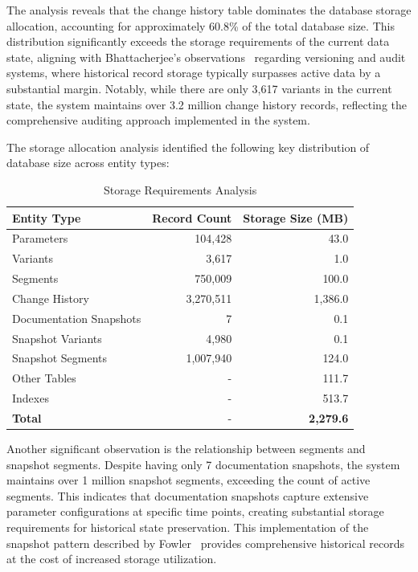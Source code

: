 The analysis reveals that the change history table dominates the database storage allocation, accounting for approximately 60.8\% of the total database size. This distribution significantly exceeds the storage requirements of the current data state, aligning with Bhattacherjee's observations~\cite{bhattacherjee2015principles} regarding versioning and audit systems, where historical record storage typically surpasses active data by a substantial margin. Notably, while there are only 3,617 variants in the current state, the system maintains over 3.2 million change history records, reflecting the comprehensive auditing approach implemented in the system.

The storage allocation analysis identified the following key distribution of database size across entity types:

\begin{table}[h]
\centering
\caption{Storage Requirements Analysis}
\label{tab:storage-requirements}
\begin{tabular}{|l|r|r|}
\hline
\textbf{Entity Type} & \textbf{Record Count} & \textbf{Storage Size (MB)} \\
\hline
Parameters & 104,428 & 43.0 \\
\hline
Variants & 3,617 & 1.0 \\
\hline
Segments & 750,009 & 100.0 \\
\hline
Change History & 3,270,511 & 1,386.0 \\
\hline
Documentation Snapshots & 7 & 0.1 \\
\hline
Snapshot Variants & 4,980 & 0.1 \\
\hline
Snapshot Segments & 1,007,940 & 124.0 \\
\hline
Other Tables & - & 111.7 \\
\hline
Indexes & - & 513.7 \\
\hline
\textbf{Total} & - & \textbf{2,279.6} \\
\hline
\end{tabular}
\end{table}

Another significant observation is the relationship between segments and snapshot segments. Despite having only 7 documentation snapshots, the system maintains over 1 million snapshot segments, exceeding the count of active segments. This indicates that documentation snapshots capture extensive parameter configurations at specific time points, creating substantial storage requirements for historical state preservation. This implementation of the snapshot pattern described by Fowler~\cite{fowler2003patterns} provides comprehensive historical records at the cost of increased storage utilization.

